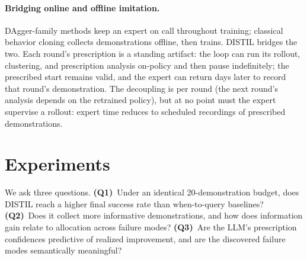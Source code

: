 \documentclass[letterpaper]{article} %
\begin{document}
\paragraph{Bridging online and offline imitation.}
DAgger-family methods keep an expert on call throughout training;
classical behavior cloning collects demonstrations offline, then trains.
DISTIL bridges the two. Each round's prescription is a standing artifact:
the loop can run its rollout, clustering, and prescription analysis
on-policy and then pause indefinitely; the prescribed start remains valid,
and the expert can return days later to record that round's demonstration.
The decoupling is per round (the next round's analysis depends on the
retrained policy), but at no point must the expert supervise a rollout:
expert time reduces to scheduled recordings of prescribed demonstrations.

\section{Experiments}
\label{sec:experiments}

We ask three questions. \textbf{(Q1)}~Under an identical 20-demonstration
budget, does DISTIL reach a higher final success rate than when-to-query
baselines? \textbf{(Q2)}~Does it collect more informative demonstrations,
and how does information gain relate to allocation across failure modes?
\textbf{(Q3)}~Are the LLM's prescription confidences predictive of realized
improvement, and are the discovered failure modes semantically meaningful?
\end{document}

